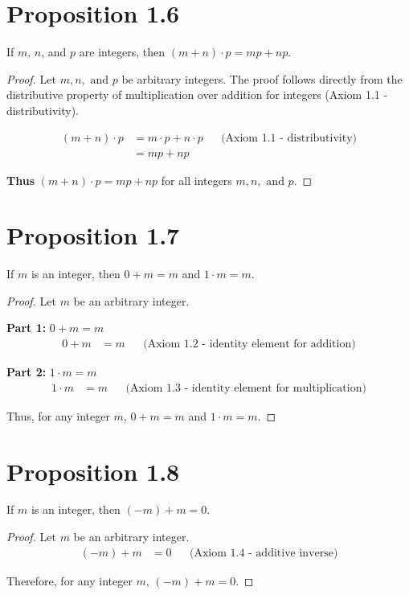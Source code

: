 \section*{Proposition 1.6}
If $m$, $n$, and $p$ are integers, then $(m+n) \cdot p = mp+np$.
\begin{proof}
    Let $m, n, \text{ and } p$ be arbitrary integers. The proof follows directly from the distributive property of multiplication over addition for integers (Axiom 1.1 - distributivity).

    \begin{align*}
        (m + n) \cdot p & = m \cdot p + n \cdot p &  & \text{(Axiom 1.1 - distributivity)} \\
                        & = mp + np
    \end{align*}

    \textbf{Thus} $(m + n) \cdot p = mp + np$ for all integers $m, n, \text{ and } p$.
\end{proof}


\section*{Proposition 1.7}
If $m$ is an integer, then $0+m = m$ and $1 \cdot m = m$.
\begin{proof}
    Let $m$ be an arbitrary integer.

    \textbf{Part 1: }$0 + m = m$
    \begin{align*}
        0 + m & = m &  & \text{(Axiom 1.2 - identity element for addition)}
    \end{align*}

    \textbf{Part 2: }$1 \cdot m = m$
    \begin{align*}
        1 \cdot m & = m &  & \text{(Axiom 1.3 - identity element for multiplication)}
    \end{align*}

    Thus, for any integer $m$, $0 + m = m$ and $1 \cdot m = m$.
\end{proof}


\section*{Proposition 1.8}
If $m$ is an integer, then $(-m)+m = 0$.
\begin{proof}
    Let $m$ be an arbitrary integer.
    \begin{align*}
        (-m) + m & = 0 &  & \text{(Axiom 1.4 - additive inverse)}
    \end{align*}

    Therefore, for any integer $m$, $(-m) + m = 0$.
\end{proof}

